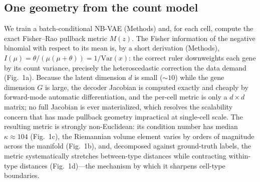 \documentclass[11pt]{article}
\newcommand{\kappamed}{104}
\begin{document}
\subsection{One geometry from the count model}
We train a batch-conditional NB-VAE (Methods) and, for each cell, compute the exact Fisher--Rao
pullback metric $M(z)$. The Fisher information of the negative binomial with respect to its mean is,
by a short derivation (Methods), $I(\mu)=\theta/(\mu(\mu+\theta))=1/\mathrm{Var}(x)$: the correct ruler
downweights each gene by its count variance, precisely the heteroscedastic correction the data
demand (Fig.~1a). Because the latent dimension $d$ is small ($\sim\!10$) while the gene dimension $G$
is large, the decoder Jacobian is computed exactly and cheaply by forward-mode automatic
differentiation, and the per-cell metric is only a $d\times d$ matrix; no full Jacobian is ever
materialized, which resolves the scalability concern that has made pullback geometry impractical at
single-cell scale. The resulting metric is strongly non-Euclidean: its condition number has median
$\kappa\!\approx\!\kappamed$ (Fig.~1c), the Riemannian volume element varies by orders of magnitude
across the manifold (Fig.~1b), and, decomposed against ground-truth labels, the metric systematically
stretches between-type distances while contracting within-type distances (Fig.~1d)---the mechanism by
which it sharpens cell-type boundaries.
\end{document}
